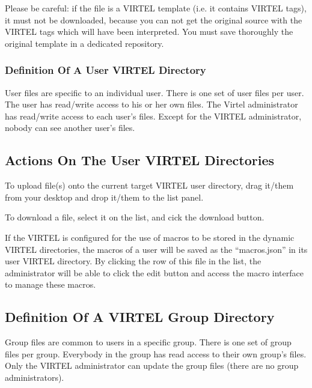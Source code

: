 \documentclass[letterpaper,10pt,english]{sphinxmanual}
\begin{document}
Please be careful: if the file is a VIRTEL template (i.e. it contains VIRTEL tags), it must not be downloaded, because you
can not get the original source with the VIRTEL tags which will have been interpreted. You must save thoroughly the
original template in a dedicated repository.


\subsubsection{Definition Of A User VIRTEL Directory}
\label{\detokenize{User_Guide:definition-of-a-user-virtel-directory}}
User files are specific to an individual user.
There is one set of user files per user.
The user has read/write access to his or her own files.
The Virtel administrator has read/write access to each user’s files.
Except for the VIRTEL administrator, nobody can see another user’s files.


\subsection{Actions On The User VIRTEL Directories}
\label{\detokenize{User_Guide:actions-on-the-user-virtel-directories}}

To upload file(s) onto the current target VIRTEL user directory, drag it/them from your desktop and drop it/them to the
list panel.


To download a file, select it on the list, and cick the download button.


If the VIRTEL is configured for the use of macros to be stored in the dynamic VIRTEL directories, the macros of a user
will be saved as the “macros.json” in its user VIRTEL directory. By clicking the row of this file in the list, the
administrator will be able to click the edit button and access the macro interface to manage these macros.


\subsection{Definition Of A VIRTEL Group Directory}
\label{\detokenize{User_Guide:definition-of-a-virtel-group-directory}}
Group files are common to users in a specific group.
There is one set of group files per group.
Everybody in the group has read access to their own group’s files.
Only the VIRTEL administrator can update the group files (there are no group administrators).
\end{document}
